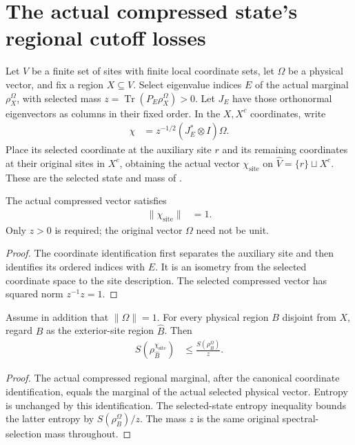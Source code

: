 \section{The actual compressed state's regional cutoff losses}
\label{sec:compressed_typical_regional_tail}

Let $V$ be a finite set of sites with finite local coordinate sets, let
$\Omega$ be a physical vector, and fix a region $X\subseteq V$.
Select eigenvalue indices $E$ of the actual marginal $\rho_X^\Omega$,
with selected mass $z=\operatorname{Tr}(P_E\rho_X^\Omega)>0$.
Let $J_E$ have those orthonormal eigenvectors as columns in their fixed
order. In the $X,X^c$ coordinates, write
\begin{align}
 \chi&=z^{-1/2}(J_E^*\otimes I)\Omega.
\end{align}
Place its selected coordinate at the auxiliary site $r$ and its remaining
coordinates at their original sites in $X^c$, obtaining the actual vector
$\chi_{\mathrm{site}}$ on $\widehat V=\{r\}\sqcup X^c$.
These are the selected state and mass of
\cite[Section~7]{OpenAI2026AreaLaw}.

\begin{theorem}
\label{thm:compressed_typical_site_norm}
\leanok
{}
The actual compressed vector satisfies
\begin{align}
 \|\chi_{\mathrm{site}}\|&=1.
\end{align}
Only $z>0$ is required; the original vector $\Omega$ need not be unit.
\end{theorem}
\begin{proof}
\leanok
The coordinate identification first separates the auxiliary site and then
identifies its ordered indices with $E$. It is an isometry from the
selected coordinate space to the site description. The selected compressed
vector has squared norm $z^{-1}z=1$.
\end{proof}

\begin{theorem}
\label{thm:compressed_typical_site_entropy}
\leanok
{}
Assume in addition that $\|\Omega\|=1$. For every physical region
$B$ disjoint from $X$, regard $B$ as the exterior-site region
$\widehat B$. Then
\begin{align}
 S\!\left(\rho_{\widehat B}^{\chi_{\mathrm{site}}}\right)
 &\le\frac{S(\rho_B^\Omega)}{z}.
\end{align}
\end{theorem}
\begin{proof}
\leanok
The actual compressed regional marginal, after the canonical coordinate
identification, equals the marginal of the actual selected physical
vector. Entropy is unchanged by this identification. The selected-state
entropy inequality bounds the latter entropy by $S(\rho_B^\Omega)/z$.
The mass $z$ is the same original spectral-selection mass throughout.
\end{proof}

